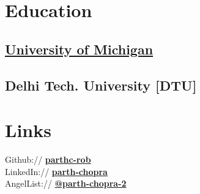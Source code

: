 \documentclass[letterpaper]{deedy-resume} %
\begin{document}
\begin{minipage}[t]{0.25\textwidth} %


\section{Education} 

\subsection{\href{https://robotics.umich.edu/profile/parth-chopra/}{University of Michigan}}

\sectionspace %

\subsection{Delhi Tech. University [DTU]}


\sectionspace %






\section{Links} 

Github:// \href{https://github.com/parthc-rob}{\bf parthc-rob} \\
LinkedIn:// \href{https://www.linkedin.com/in/parth-chopra-b7414068}{\bf parth-chopra} \\
AngelList:// \href{https://angel.co/parth-chopra-2}{\bf @parth-chopra-2} \\


\end{minipage}
\end{document}
